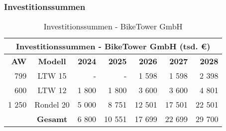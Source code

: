 \subsubsection{Investitionssummen}

\begin{table}[H]
    \centering
    \begin{tabular}{rcrrrrr}
        \multicolumn{7}{c}{\textbf{Investitionssummen - BikeTower GmbH} (tsd. \euro{})}                               \\
        \toprule
        \textbf{AW} & \textbf{Modell} & \textbf{2024} & \textbf{2025} & \textbf{2026} & \textbf{2027} & \textbf{2028} \\
        \midrule
        799         & LTW 15          & -             & -             & 1 598         & 1 598         & 2 398         \\
        600         & LTW 12          & 1 800         & 1 800         & 3 600         & 3 600         & 4 801         \\
        1 250       & Rondel 20       & 5 000         & 8 751         & 12 501        & 17 501        & 22 501        \\
        \midrule
                    & \textbf{Gesamt} & 6 800         & 10 551        & 17 699        & 22 699        & 29 700        \\
        \bottomrule
    \end{tabular}
    \caption{Investitionssummen - BikeTower GmbH}
    \label{tab:investitionssummen_biketower}
\end{table}
